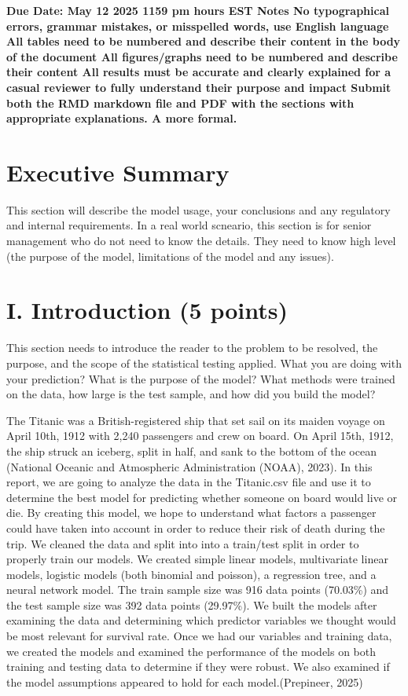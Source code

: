\documentclass[
  letterpaper,
  DIV=11,
  numbers=noendperiod]{scrartcl}
\begin{document}
\textbf{Due Date: May 12 2025 1159 pm hours EST Notes No typographical
errors, grammar mistakes, or misspelled words, use English language All
tables need to be numbered and describe their content in the body of the
document All figures/graphs need to be numbered and describe their
content All results must be accurate and clearly explained for a casual
reviewer to fully understand their purpose and impact Submit both the
RMD markdown file and PDF with the sections with appropriate
explanations. A more formal.}

\section{Executive Summary}\label{executive-summary}

This section will describe the model usage, your conclusions and any
regulatory and internal requirements. In a real world scneario, this
section is for senior management who do not need to know the details.
They need to know high level (the purpose of the model, limitations of
the model and any issues).

\section{I. Introduction (5 points)}\label{i.-introduction-5-points}

This section needs to introduce the reader to the problem to be
resolved, the purpose, and the scope of the statistical testing applied.
What you are doing with your prediction? What is the purpose of the
model? What methods were trained on the data, how large is the test
sample, and how did you build the model?

The Titanic was a British-registered ship that set sail on its maiden
voyage on April 10th, 1912 with 2,240 passengers and crew on board. On
April 15th, 1912, the ship struck an iceberg, split in half, and sank to
the bottom of the ocean (National Oceanic and Atmospheric Administration
(NOAA), 2023). In this report, we are going to analyze the data in the
Titanic.csv file and use it to determine the best model for predicting
whether someone on board would live or die. By creating this model, we
hope to understand what factors a passenger could have taken into
account in order to reduce their risk of death during the trip. We
cleaned the data and split into into a train/test split in order to
properly train our models. We created simple linear models, multivariate
linear models, logistic models (both binomial and poisson), a regression
tree, and a neural network model. The train sample size was 916 data
points (70.03\%) and the test sample size was 392 data points (29.97\%).
We built the models after examining the data and determining which
predictor variables we thought would be most relevant for survival rate.
Once we had our variables and training data, we created the models and
examined the performance of the models on both training and testing data
to determine if they were robust. We also examined if the model
assumptions appeared to hold for each model.(Prepineer, 2025)
\end{document}
